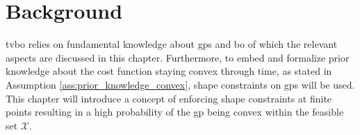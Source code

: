 \chapter{Background}
\label{chap:background}

\gls{tvbo} relies on fundamental knowledge about \glspl{gp} and \gls{bo} of which the relevant aspects are discussed in this chapter. Furthermore, to embed and formalize prior knowledge about the cost function staying convex through time, as stated in Assumption \ref{ass:prior_knowledge_convex}, shape constraints on \glspl{gp} will be used. This chapter will introduce a concept of enforcing shape constraints at finite points resulting in a high probability of the \gls{gp} being convex within the feasible set $\mathcal{X}$.


